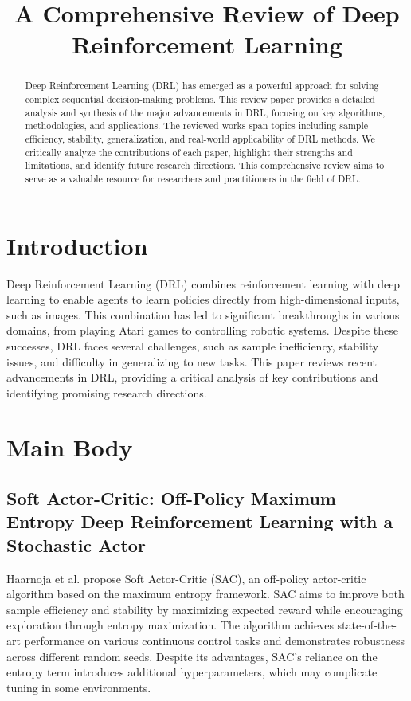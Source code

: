 \documentclass[12pt]{article}
\title{A Comprehensive Review of Deep Reinforcement Learning}
\author{}
\date{}
\begin{document}
\maketitle

\begin{abstract}
Deep Reinforcement Learning (DRL) has emerged as a powerful approach for solving complex sequential decision-making problems. This review paper provides a detailed analysis and synthesis of the major advancements in DRL, focusing on key algorithms, methodologies, and applications. The reviewed works span topics including sample efficiency, stability, generalization, and real-world applicability of DRL methods. We critically analyze the contributions of each paper, highlight their strengths and limitations, and identify future research directions. This comprehensive review aims to serve as a valuable resource for researchers and practitioners in the field of DRL.
\end{abstract}

\section{Introduction}
Deep Reinforcement Learning (DRL) combines reinforcement learning with deep learning to enable agents to learn policies directly from high-dimensional inputs, such as images. This combination has led to significant breakthroughs in various domains, from playing Atari games to controlling robotic systems. Despite these successes, DRL faces several challenges, such as sample inefficiency, stability issues, and difficulty in generalizing to new tasks. This paper reviews recent advancements in DRL, providing a critical analysis of key contributions and identifying promising research directions.

\section{Main Body}

\subsection{Soft Actor-Critic: Off-Policy Maximum Entropy Deep Reinforcement Learning with a Stochastic Actor}
Haarnoja et al. \cite{haarnoja2018soft} propose Soft Actor-Critic (SAC), an off-policy actor-critic algorithm based on the maximum entropy framework. SAC aims to improve both sample efficiency and stability by maximizing expected reward while encouraging exploration through entropy maximization. The algorithm achieves state-of-the-art performance on various continuous control tasks and demonstrates robustness across different random seeds. Despite its advantages, SAC's reliance on the entropy term introduces additional hyperparameters, which may complicate tuning in some environments.
\end{document}
